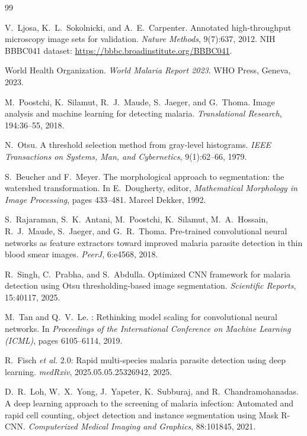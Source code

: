 \documentclass[10pt,twocolumn]{article}
\newcommand{\etal}{\textit{et al.}}
\begin{document}
\begin{thebibliography}{99}

V.~Ljosa, K.~L.~Sokolnicki, and A.~E.~Carpenter.
\newblock Annotated high-throughput microscopy image sets for validation.
\newblock \textit{Nature Methods}, 9(7):637, 2012.
\newblock NIH BBBC041 dataset: \url{https://bbbc.broadinstitute.org/BBBC041}.

World Health Organization.
\newblock \textit{World Malaria Report 2023}.
\newblock WHO Press, Geneva, 2023.

M.~Poostchi, K.~Silamut, R.~J.~Maude, S.~Jaeger, and G.~Thoma.
\newblock Image analysis and machine learning for detecting malaria.
\newblock \textit{Translational Research}, 194:36--55, 2018.

N.~Otsu.
\newblock A threshold selection method from gray-level histograms.
\newblock \textit{IEEE Transactions on Systems, Man, and Cybernetics},
  9(1):62--66, 1979.

S.~Beucher and F.~Meyer.
\newblock The morphological approach to segmentation: the watershed
  transformation.
\newblock In E.~Dougherty, editor, \textit{Mathematical Morphology in Image
  Processing}, pages 433--481. Marcel Dekker, 1992.

S.~Rajaraman, S.~K.~Antani, M.~Poostchi, K.~Silamut, M.~A.~Hossain,
  R.~J.~Maude, S.~Jaeger, and G.~R.~Thoma.
\newblock Pre-trained convolutional neural networks as feature extractors
  toward improved malaria parasite detection in thin blood smear images.
\newblock \textit{PeerJ}, 6:e4568, 2018.

R.~Singh, C.~Prabha, and S.~Abdulla.
\newblock Optimized {CNN} framework for malaria detection using
  {Otsu} thresholding-based image segmentation.
\newblock \textit{Scientific Reports}, 15:40117, 2025.

M.~Tan and Q.~V.~Le.
: Rethinking model scaling for convolutional neural
  networks.
\newblock In \textit{Proceedings of the International Conference on Machine
  Learning (ICML)}, pages 6105--6114, 2019.

R.~Fisch \etal
{} 2.0: Rapid multi-species malaria parasite detection
  using deep learning.
\newblock \textit{medRxiv}, 2025.05.05.25326942, 2025.

D.~R.~Loh, W.~X.~Yong, J.~Yapeter, K.~Subburaj, and R.~Chandramohanadas.
\newblock A deep learning approach to the screening of malaria infection:
  Automated and rapid cell counting, object detection and instance
  segmentation using {Mask R-CNN}.
\newblock \textit{Computerized Medical Imaging and Graphics}, 88:101845, 2021.


\end{thebibliography}
\end{document}
